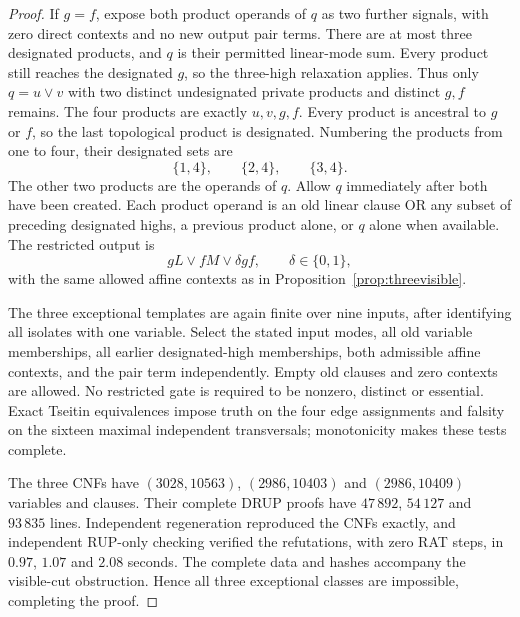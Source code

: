 \begin{proof}
If $g=f$, expose both product operands of $q$ as two further signals, with zero direct contexts and no new output pair terms. There are at most three designated products, and $q$ is their permitted linear-mode sum. Every product still reaches the designated $g$, so the three-high relaxation applies. Thus only $q=u\vee v$ with two distinct undesignated private products and distinct $g,f$ remains. The four products are exactly $u,v,g,f$. Every product is ancestral to $g$ or $f$, so the last topological product is designated. Numbering the products from one to four, their designated sets are
\[
 \{1,4\},\qquad\{2,4\},\qquad\{3,4\}.
\]
The other two products are the operands of $q$. Allow $q$ immediately after both have been created. Each product operand is an old linear clause OR any subset of preceding designated highs, a previous product alone, or $q$ alone when available. The restricted output is
\[
 gL\vee fM\vee\delta gf,
 \qquad\delta\in\{0,1\},
\]
with the same allowed affine contexts as in Proposition~\ref{prop:threevisible}.

The three exceptional templates are again finite over nine inputs, after identifying all isolates with one variable. Select the stated input modes, all old variable memberships, all earlier designated-high memberships, both admissible affine contexts, and the pair term independently. Empty old clauses and zero contexts are allowed. No restricted gate is required to be nonzero, distinct or essential. Exact Tseitin equivalences impose truth on the four edge assignments and falsity on the sixteen maximal independent transversals; monotonicity makes these tests complete.

The three CNFs have $(3028,10563)$, $(2986,10403)$ and $(2986,10409)$ variables and clauses. Their complete DRUP proofs have $47\,892$, $54\,127$ and $93\,835$ lines. Independent regeneration reproduced the CNFs exactly, and independent RUP-only checking verified the refutations, with zero RAT steps, in $0.97$, $1.07$ and $2.08$ seconds. The complete data and hashes accompany the visible-cut obstruction. Hence all three exceptional classes are impossible, completing the proof.
\end{proof}


